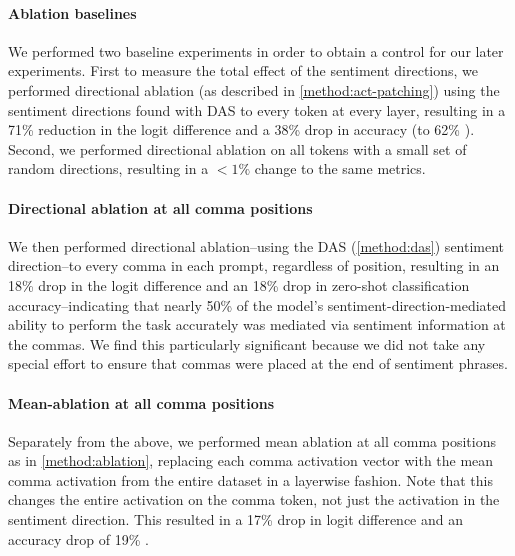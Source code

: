 \documentclass{article} %
\newcommand{\ablateDirectionTreebankLDDrop}{71\% }
\newcommand{\ablateDirectionTreebankAccDrop}{38\% }
\newcommand{\ablateDirectionTreebankAcc}{62\% }
\newcommand{\ablateCommasDirectionTreebankLDDrop}{18\% }
\newcommand{\ablateCommasDirectionTreebankAccDrop}{18\% }
\newcommand{\ablateCommasMeanTreebankLDDrop}{17\% }
\newcommand{\ablateCommasMeanPatchTreebankAccDrop}{19\% }
\begin{document}
            \paragraph{Ablation baselines}
            We performed two baseline experiments in order to obtain a control for our later experiments. First to measure the total effect of the sentiment directions, we performed directional ablation (as described in \ref{method:act-patching}) using the sentiment directions found with DAS to every token at every layer, resulting in a \ablateDirectionTreebankLDDrop reduction in the logit difference and a \ablateDirectionTreebankAccDrop drop in accuracy (to \ablateDirectionTreebankAcc). Second, we performed directional ablation on all tokens with a small set of random directions, resulting in a $<1\%$ change to the same metrics.
            \paragraph{Directional ablation at all comma positions} We then performed directional ablation--using the DAS (\ref{method:das}) sentiment direction--to every comma in each prompt, regardless of position, resulting in an \ablateCommasDirectionTreebankLDDrop drop in the logit difference and an \ablateCommasDirectionTreebankAccDrop drop in zero-shot classification accuracy--indicating that nearly 50\% of the model's sentiment-direction-mediated ability to perform the task accurately was mediated via sentiment information at the commas. We find this particularly significant because we did not take any special effort to ensure that commas were placed at the end of sentiment phrases.
            \paragraph{Mean-ablation at all comma positions} Separately from the above, we performed mean ablation at all comma positions as in \ref{method:ablation}, replacing each comma activation vector with the mean comma activation from the entire dataset in a layerwise fashion. Note that this changes the entire activation on the comma token, not just the activation in the sentiment direction. This resulted in a \ablateCommasMeanTreebankLDDrop drop in logit difference and an accuracy drop of \ablateCommasMeanPatchTreebankAccDrop.
\end{document}
